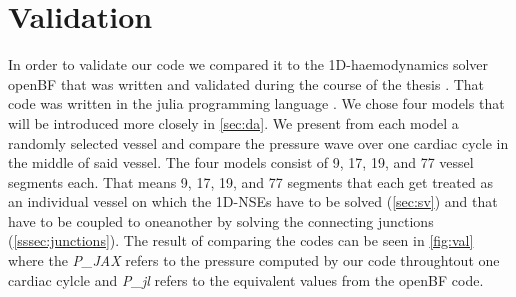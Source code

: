 \documentclass[a4paper, oneside]{discothesis}
\begin{document}
					\section{Validation} \label{sec:val}
						In order to validate our code we compared it to the 1D-haemodynamics solver openBF \cite{openBF} that was written and validated during the course of the thesis \cite{melis2017gaussian}.
						That code was written in the julia programming language \cite{julia}.
						We chose four models that will be introduced more closely in \autoref{sec:da}.
						We present from each model a randomly selected vessel and compare the pressure wave over one cardiac cycle in the middle of said vessel.
						The four models consist of 9, 17, 19, and 77 vessel segments each.
						That means 9, 17, 19, and 77 segments that each get treated as an individual vessel on which the 1D-NSEs have to be solved (\autoref{sec:sv}) and that have to be coupled to oneanother by solving the connecting junctions (\autoref{sssec:junctions}).
						The result of comparing the codes can be seen in \autoref{fig:val} where the \emph{P\_JAX} refers to the pressure computed by our code throughtout one cardiac cylcle and \emph{P\_jl} refers to the equivalent values from the openBF code.
\end{document}
